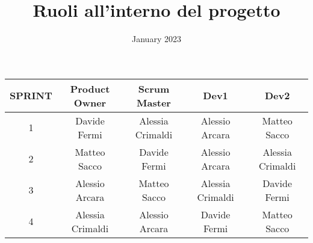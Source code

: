 \documentclass{article}
\title{Ruoli all'interno del progetto}
\date{January 2023}
\begin{document}
    \maketitle

    \begin{center}
        \begin{tabular}{ |c|c|c|c|c| }
            \hline
            SPRINT & Product Owner    & Scrum Master     & Dev1             & Dev2             \\
            \hline
            1      & Davide Fermi     & Alessia Crimaldi & Alessio Arcara   & Matteo Sacco     \\
            \hline
            2      & Matteo Sacco     & Davide Fermi     & Alessio Arcara   & Alessia Crimaldi \\
            \hline
            3      & Alessio Arcara   & Matteo Sacco   & Alessia Crimaldi   & Davide Fermi     \\
            \hline
            4      & Alessia Crimaldi & Alessio Arcara  & Davide Fermi      & Matteo Sacco   \\
            \hline
        \end{tabular}
    \end{center}
\end{document}
